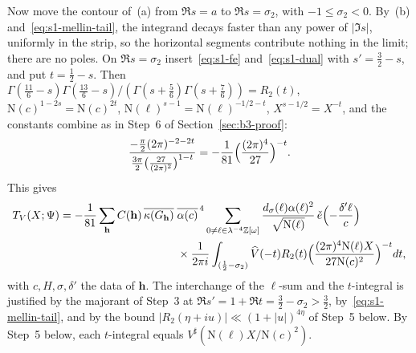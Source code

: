 \documentclass[11pt]{article}
\numberwithin{equation}{section}
\newcommand{\OO}{\mathbb Z[\omega]}
\newcommand{\N}{\mathrm N}
\newcommand{\ce}{\check e}
\begin{document}
Now move the contour of~(a) from $\Re s=a$ to $\Re s=\sigma_2$, with $-1\le\sigma_2<0$. By~(b)
and~\eqref{eq:s1-mellin-tail}, the integrand decays faster than any power of $|\Im s|$, uniformly in the strip, so
the horizontal segments contribute nothing in the limit; there are no poles. On $\Re s=\sigma_2$
insert~\eqref{eq:s1-fe} and~\eqref{eq:s1-dual} with $s'=\frac32-s$, and put $t=\frac12-s$. Then
$\Gamma(\frac{11}6-s)\Gamma(\frac{13}6-s)/(\Gamma(s+\frac56)\Gamma(s+\frac76))=R_2(t)$,
$\N(c)^{1-2s}=\N(c)^{2t}$, $\N(\ell)^{s-1}=\N(\ell)^{-1/2-t}$, $X^{s-1/2}=X^{-t}$, and the constants combine as in
Step~6 of Section~\ref{sec:b3-proof}:
\begin{equation}\label{eq:d135}
 \frac{-\frac\pi2(2\pi)^{-2-2t}}{\frac{3\pi}2\bigl(\frac{27}{(2\pi)^2}\bigr)^{1-t}}
 =-\frac1{81}\Bigl(\frac{(2\pi)^4}{27}\Bigr)^{-t}.
\end{equation}
This gives
\begin{equation}\label{eq:d136}
\begin{split}
 T_V(X;\Psi)=-\frac1{81}\sum_{\mathbf h}C(\mathbf h)\,\overline{\kappa(G_{\mathbf h})}\;
 &\overline{\alpha(c)}^{\,4}\sum_{0\ne\ell\in\lambda^{-4}\OO}\frac{d_\sigma(\ell)\alpha(\ell)^2}{\sqrt{\N(\ell)}}\,
 \ce\Bigl(-\frac{\delta'\ell}c\Bigr)\\
 &\times\frac1{2\pi i}\int_{(\frac12-\sigma_2)}\widehat V(-t)R_2(t)
 \Bigl(\frac{(2\pi)^4\N(\ell)X}{27\N(c)^2}\Bigr)^{-t}dt,
\end{split}
\end{equation}
with $c,H,\sigma,\delta'$ the data of $\mathbf h$. The interchange of the $\ell$-sum and the $t$-integral is justified by the
majorant of Step~3 at $\Re s'=1+\Re t=\frac32-\sigma_2>\frac32$, by~\eqref{eq:s1-mellin-tail}, and by the bound
$|R_2(\eta+iu)|\ll(1+|u|)^{4\eta}$ of Step~5 below. By Step~5 below, each $t$-integral equals
$V^\sharp(\N(\ell)X/\N(c)^2)$.
\end{document}

